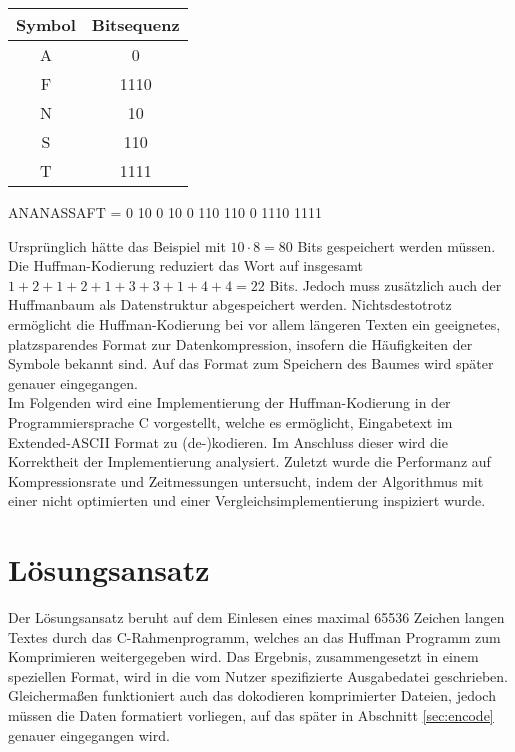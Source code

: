 \documentclass[course=erap]{aspdoc}
\begin{document}
\begin{center}
    \begin{tabular}{c|c}
        \textbf{Symbol} & \textbf{Bitsequenz} \\
        \hline
        A & 0 \\
        F & 1110 \\
        N & 10 \\
        S & 110 \\
        T & 1111
    \end{tabular}
    \label{tab:my_label}
\end{center}
\begin{center}
    ANANASSAFT = 0 10 0 10 0 110 110 0 1110 1111
\end{center}
Ursprünglich hätte das Beispiel mit $10\cdot8 = 80$ Bits gespeichert werden müssen. Die Huffman-Kodierung reduziert das Wort auf insgesamt $1+2+1+2+1+3+3+1+4+4=22$ Bits. Jedoch muss zusätzlich auch der Huffmanbaum als Datenstruktur abgespeichert werden. Nichtsdestotrotz ermöglicht die Huffman-Kodierung bei vor allem längeren Texten ein geeignetes, platzsparendes Format zur Datenkompression, insofern die Häufigkeiten der Symbole bekannt sind. Auf das Format zum Speichern des Baumes wird später genauer eingegangen.\cite{4051119}\\
Im Folgenden wird eine Implementierung der Huffman-Kodierung in der Programmiersprache C vorgestellt, welche es ermöglicht, Eingabetext im Extended-ASCII Format zu (de-)kodieren. Im Anschluss dieser wird die Korrektheit der Implementierung analysiert. Zuletzt wurde die Performanz auf Kompressionsrate und Zeitmessungen untersucht, indem der Algorithmus mit einer nicht optimierten und einer Vergleichsimplementierung inspiziert wurde.

\section{Lösungsansatz}

Der Lösungsansatz beruht auf dem Einlesen eines maximal 65536 Zeichen langen Textes durch das C-Rahmenprogramm, welches an das Huffman Programm zum Komprimieren weitergegeben wird. Das Ergebnis, zusammengesetzt in einem speziellen Format, wird in die vom Nutzer spezifizierte Ausgabedatei geschrieben. Gleichermaßen funktioniert auch das dokodieren komprimierter Dateien, jedoch müssen die Daten formatiert vorliegen, auf das später in Abschnitt \ref{sec:encode} genauer eingegangen wird.
\end{document}

